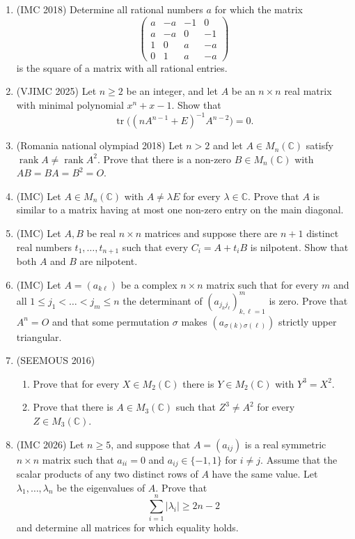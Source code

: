 \documentclass[11pt,a4paper]{article}
\DeclareMathOperator{\tr}{tr}
\DeclareMathOperator{\rank}{rank}
\begin{document}
\begin{enumerate}
\item (IMC 2018) Determine all rational numbers $a$ for which the matrix
\[
\begin{pmatrix}a&-a&-1&0\\a&-a&0&-1\\1&0&a&-a\\0&1&a&-a\end{pmatrix}
\]
is the square of a matrix with all rational entries.

\item (VJIMC 2025) Let $n\geqslant2$ be an integer, and let $A$ be an $n\times n$ real matrix with
minimal polynomial $x^n+x-1$. Show that
\[
\tr\bigl((nA^{n-1}+E)^{-1}A^{n-2}\bigr)=0.
\]

\item (Romania national olympiad 2018) Let $n>2$ and let $A\in M_n(\mathbb C)$ satisfy
$\rank A\ne\rank A^2$. Prove that there is a non-zero $B\in M_n(\mathbb C)$ with
$AB=BA=B^2=O$.

\item (IMC) Let $A\in M_n(\mathbb C)$ with $A\ne\lambda E$ for every $\lambda\in\mathbb C$. Prove
that $A$ is similar to a matrix having at most one non-zero entry on the main diagonal.

\item (IMC) Let $A,B$ be real $n\times n$ matrices and suppose there are $n+1$ distinct real
numbers $t_1,\dots,t_{n+1}$ such that every $C_i=A+t_iB$ is nilpotent. Show that both $A$ and
$B$ are nilpotent.

\item (IMC) Let $A=(a_{k\ell})$ be a complex $n\times n$ matrix such that for every $m$ and all
$1\leqslant j_1<\dots<j_m\leqslant n$ the determinant of $(a_{j_kj_\ell})_{k,\ell=1}^m$ is zero.
Prove that $A^n=O$ and that some permutation $\sigma$ makes $(a_{\sigma(k)\sigma(\ell)})$
strictly upper triangular.

\item (SEEMOUS 2016)
\begin{enumerate}[label=\alph*),align=left]
\item Prove that for every $X\in M_2(\mathbb C)$ there is $Y\in M_2(\mathbb C)$ with $Y^3=X^2$.
\item Prove that there is $A\in M_3(\mathbb C)$ such that $Z^3\ne A^2$ for every
$Z\in M_3(\mathbb C)$.
\end{enumerate}

\item (IMC 2026) Let $n\geqslant5$, and suppose that $A=(a_{ij})$ is a real symmetric $n\times n$
matrix such that $a_{ii}=0$ and $a_{ij}\in\{-1,1\}$ for $i\ne j$. Assume that the scalar products
of any two distinct rows of $A$ have the same value. Let $\lambda_1,\dots,\lambda_n$ be the
eigenvalues of $A$. Prove that
\[
\sum_{i=1}^n|\lambda_i|\geqslant2n-2
\]
and determine all matrices for which equality holds.
\end{enumerate}
\end{document}
